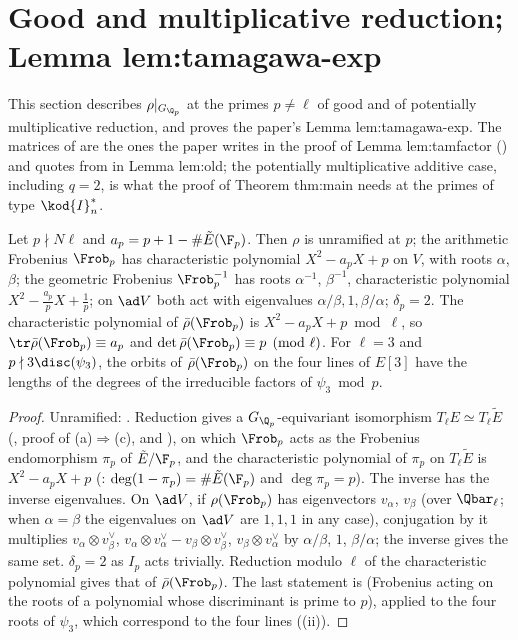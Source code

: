 \section[Good and multiplicative reduction]{Good and multiplicative reduction; Lemma lem:tamagawa-exp}\label{sec:galrep:mult}

This section describes $\rho|_{G_{\Q_p}}$ at the primes $p\ne\ell$ of good and of potentially multiplicative reduction, and proves the paper's
Lemma lem:tamagawa-exp. The matrices of  are the ones the paper writes in the proof of Lemma lem:tamfactor
() and quotes from \cite[Theorem 3.1(e)]{DDT} in Lemma lem:old; the potentially multiplicative additive case, including
$q=2$, is what the proof of Theorem thm:main needs at the primes of type $\kod{I}_n^*$.

\begin{proposition}\label{prop:galrep:good}
Let $p\nmid N\ell$ and $a_p=p+1-\#\tilde E(\F_p)$. Then $\rho$ is unramified at $p$; the arithmetic Frobenius $\Frob_p$ has characteristic polynomial
$X^2-a_pX+p$ on $V$, with roots $\alpha$, $\beta$; the geometric Frobenius $\Frob_p^{-1}$ has roots $\alpha^{-1}$, $\beta^{-1}$, characteristic polynomial
$X^2-\frac{a_p}{p}X+\frac1p$; on $\ad V$ both act with eigenvalues $\alpha/\beta,1,\beta/\alpha$; $\delta_p=2$. The characteristic polynomial of $\bar\rho(\Frob_p)$
is $X^2-a_pX+p\bmod\ell$, so $\tr\bar\rho(\Frob_p)\equiv a_p$ and $\det\bar\rho(\Frob_p)\equiv p\pmod\ell$. For $\ell=3$ and $p\nmid3\disc(\psi_3)$, the orbits of $\bar\rho(\Frob_p)$
on the four lines of $E[3]$ have the lengths of the degrees of the irreducible factors of $\psi_3\bmod p$.
\end{proposition}

\begin{proof}
Unramified: . Reduction gives a $G_{\Q_p}$-equivariant isomorphism $T_\ell E\simeq T_\ell\tilde E$ (, proof of
(a)$\Rightarrow$(c), and ), on which $\Frob_p$ acts as the Frobenius endomorphism $\pi_p$ of $\tilde E/\F_p$, and the
characteristic polynomial of $\pi_p$ on $T_\ell\tilde E$ is $X^2-a_pX+p$ (: $\deg(1-\pi_p)=\#\tilde E(\F_p)$ and $\deg\pi_p=p$). The inverse has
the inverse eigenvalues. On $\ad V$, if $\rho(\Frob_p)$ has eigenvectors $v_\alpha$, $v_\beta$ (over $\Qbar_\ell$; when $\alpha=\beta$ the eigenvalues on
$\ad V$ are $1,1,1$ in any case), conjugation by it multiplies $v_\alpha\otimes v_\beta^\vee$, $v_\alpha\otimes v_\alpha^\vee-v_\beta\otimes v_\beta^\vee$, $v_\beta\otimes v_\alpha^\vee$
by $\alpha/\beta$, $1$, $\beta/\alpha$; the inverse gives the same set. $\delta_p=2$ as $I_p$ acts trivially. Reduction modulo $\ell$ of the characteristic
polynomial gives that of $\bar\rho(\Frob_p)$. The last statement is  (Frobenius acting on the roots of a polynomial whose
discriminant is prime to $p$), applied to the four roots of $\psi_3$, which correspond to the four lines ((ii)).
\end{proof}

